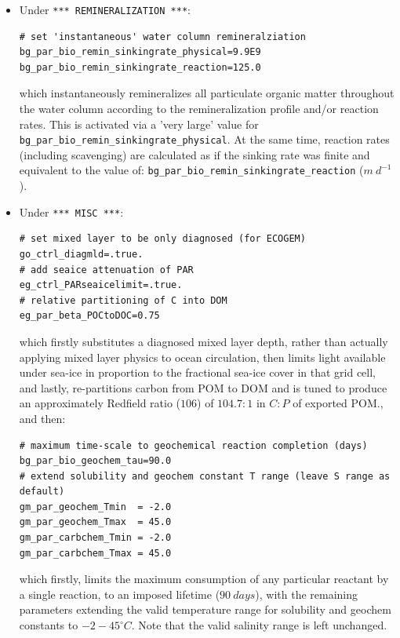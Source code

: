 \begin{itemize}[noitemsep]

\vspace{2mm}
\item Under \texttt{*** REMINERALIZATION ***}:
\small\vspace{-1mm}\begin{verbatim}
# set 'instantaneous' water column remineralziation
bg_par_bio_remin_sinkingrate_physical=9.9E9
bg_par_bio_remin_sinkingrate_reaction=125.0
\end{verbatim}\vspace{-1mm}\normalsize
which instantaneously remineralizes all particulate organic matter throughout the water column according to the remineralization profile and/or reaction rates. This is activated via a 'very large' value for  \texttt{bg\_par\_bio\_remin\_sinkingrate\_physical}. At the same time, reaction rates (including scavenging) are calculated as if the sinking rate was finite and equivalent to the value of: \texttt{bg\_par\_bio\_remin\_sinkingrate\_reaction} (\(m\:d^{-1}\)). 

\vspace{2mm}
\item Under \texttt{*** MISC ***}:
\small\vspace{-1mm}\begin{verbatim}
# set mixed layer to be only diagnosed (for ECOGEM)
go_ctrl_diagmld=.true.
# add seaice attenuation of PAR
eg_ctrl_PARseaicelimit=.true.
# relative partitioning of C into DOM
eg_par_beta_POCtoDOC=0.75
\end{verbatim}\vspace{-1mm}\normalsize
which firstly substitutes a diagnosed mixed layer depth, rather than actually applying mixed layer physics to ocean circulation, then limits light available under sea-ice in proportion to the fractional sea-ice cover in that grid cell, and lastly, re-partitions carbon from POM to DOM and is tuned to produce an approximately Redfield ratio (\(106\)) of \(104.7:1\) in \(C:P\) of exported POM., and then:
\small\vspace{-1mm}\begin{verbatim}
# maximum time-scale to geochemical reaction completion (days)
bg_par_bio_geochem_tau=90.0
# extend solubility and geochem constant T range (leave S range as default)
gm_par_geochem_Tmin  = -2.0
gm_par_geochem_Tmax  = 45.0
gm_par_carbchem_Tmin = -2.0
gm_par_carbchem_Tmax = 45.0
\end{verbatim}\vspace{-1mm}\normalsize
which firstly, limits the maximum consumption of any particular reactant by a single reaction, to an imposed lifetime (\(90\:days\)), with the remaining parameters extending the valid temperature range for solubility and geochem constants to \(-2 - 45^{\circ}C\). Note that the valid salinity range is left unchanged.

\end{itemize}

